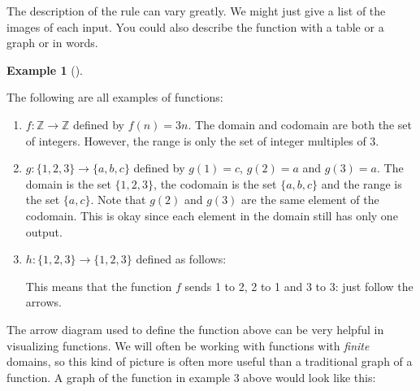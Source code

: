 \documentclass[10pt,]{book}
\theoremstyle{plain}
\theoremstyle{definition}
\newtheorem{example}[theorem]{Example}
\theoremstyle{definition}
\theoremstyle{definition}
\numberwithin{equation}{section}
\def\Z{\mathbb Z}
\begin{document}
      The description of the rule can vary greatly. We might just give a list of the images of each input. You could also describe the function with a table or a graph or in words.
\begin{example}[]\label{example-16}

          The following are all examples of functions:

          \leavevmode%
\begin{enumerate}
\item\hypertarget{li-276}{}\(f:\Z \to \Z\) defined by \(f(n) = 3n\). The domain and codomain are both the set of integers. However, the range is only the set of integer multiples of 3.%
\item\hypertarget{li-277}{}\(g: \{1,2,3\} \to \{a,b,c\}\) defined by \(g(1) = c\), \(g(2) = a\) and \(g(3) = a\). The domain is the set \(\{1,2,3\}\), the codomain is the set \(\{a,b,c\}\) and the range is the set \(\{a,c\}\). Note that \(g(2)\) and \(g(3)\) are the same element of the codomain. This is okay since each element in the domain still has only one output.%
\item\hypertarget{li-278}{}\(h:\{1,2,3\} \to \{1,2,3\}\) defined as follows:

                \leavevmode%
\begin{figure}
\centering
{
}
\end{figure}

                This means that the function \(f\) sends 1 to 2, 2 to 1 and 3 to 3: just follow the arrows.

\end{enumerate}

\end{example}
\par

      The arrow diagram used to define the function above can be very helpful in visualizing functions. We will often be working with functions with \emph{finite} domains, so this kind of picture is often more useful than a traditional graph of a function. A graph of the function in example 3 above would look like this:
\leavevmode%
\begin{figure}
\centering
{
}
\end{figure}
\par
\end{document}

